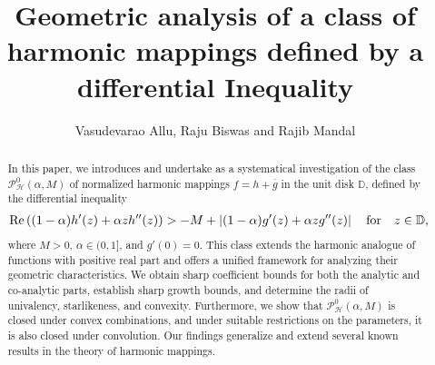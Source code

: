 \documentclass[11pt,reqno]{amsart}
\newtheorem{open problem}{Open problem}[section]
\newcommand{\beas}{\begin{eqnarray*}}
\newcommand{\eeas}{\end{eqnarray*}}
\numberwithin{equation}{section}
\begin{document}
\title[Geometric analysis ]{Geometric analysis of a class of harmonic mappings defined by a differential Inequality}
\author[V. Allu, R. Biswas and R. Mandal ]{Vasudevarao Allu, Raju Biswas and Rajib Mandal}
\date{}
\address{Vasudevarao Allu, Department of Mathematics, School of Basic Sciences, Indian Institute of Technology Bhubaneswar, Bhubaneswar-752050, Odisha, India.}
\address{Raju Biswas, Department of Mathematics, Raiganj University, Raiganj, West Bengal-733134, India.}
\address{Rajib Mandal, Department of Mathematics, Raiganj University, Raiganj, West Bengal-733134, India.}
\let\thefootnote\relax
{}
\begin{abstract}
In this paper, we introduces and undertake as a systematical investigation of the class $\mathcal{P}_{\mathcal{H}}^{0}(\alpha,M)$ of normalized harmonic mappings $f = h + \overline{g}$ in the unit disk $\mathbb{D}$, defined by the differential inequality
\beas
\text{Re}\left((1-\alpha)h'(z) + \alpha z h''(z)\right) > -M + \left|(1-\alpha)g'(z) + \alpha z g''(z)\right|\quad\text{for}\quad z\in\Bbb{D},
\eeas
where $M > 0$, $\alpha \in (0,1]$, and $g'(0) = 0$. This class extends the harmonic analogue of functions with positive real part and offers a unified framework for analyzing their geometric characteristics. We obtain sharp coefficient bounds for both the analytic and co-analytic parts, establish sharp growth bounds, and determine the radii of univalency, starlikeness, and convexity. Furthermore, we show that $\mathcal{P}_{\mathcal{H}}^{0}(\alpha,M)$ is closed under convex combinations, and under suitable restrictions on the  parameters, it is also closed under convolution. Our findings generalize and extend several known
results in the theory of harmonic mappings.
\end{abstract}
\maketitle
\end{document}
